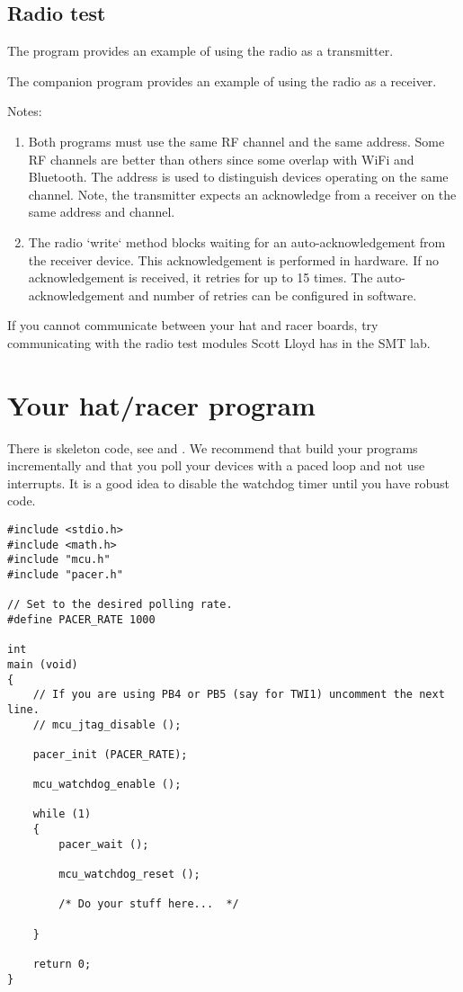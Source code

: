 \subsection{Radio test}
\label{radio-test}

The program  provides
an example of using the radio as a transmitter.

The companion program
 provides an example
of using the radio as a receiver.

Notes:
%
\begin{enumerate}
\item
  Both programs must use the same RF channel and the same address. Some
  RF channels are better than others since some overlap with WiFi
  and Bluetooth. The address is used to distinguish devices
  operating on the same channel. Note, the transmitter expects an
  acknowledge from a receiver on the same address and channel.
\item
  The radio `write` method blocks waiting for an auto-acknowledgement
  from the receiver device. This acknowledgement is performed in
  hardware. If no acknowledgement is received, it retries for up to 15
  times. The auto-acknowledgement and number of retries can be
  configured in software.
\end{enumerate}

If you cannot communicate between your hat and racer boards, try
communicating with the radio test modules Scott Lloyd has in the SMT
lab.

\section{Your hat/racer program}
\label{your-hatracer-program}

There is skeleton code, see
 and
. We recommend that
build your programs incrementally and that you poll your devices with a
paced loop and not use interrupts. It is a good idea to disable the
watchdog timer until you have robust code.

\begin{verbatim}
#include <stdio.h>
#include <math.h>
#include "mcu.h"
#include "pacer.h"

// Set to the desired polling rate.
#define PACER_RATE 1000

int
main (void)
{
    // If you are using PB4 or PB5 (say for TWI1) uncomment the next line.
    // mcu_jtag_disable ();    

    pacer_init (PACER_RATE);    
    
    mcu_watchdog_enable ();

    while (1)
    {
        pacer_wait ();

        mcu_watchdog_reset ();

        /* Do your stuff here...  */
        
    }
    
    return 0;
}
\end{verbatim}

